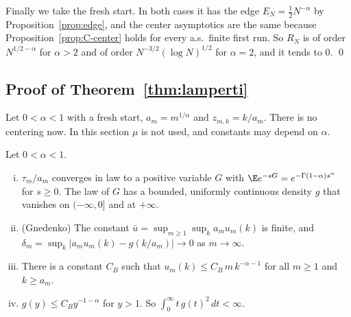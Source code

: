Finally we take the fresh start. In both cases it has the edge $E_N=\frac12N^{-\alpha}$
by Proposition~\ref{prop:edge}, and the center asymptotics are the same because
Proposition~\ref{prop:C-center} holds for every a.s.\ finite first run. So $R_N$ is of
order $N^{1/2-\alpha}$ for $\alpha>2$ and of order $N^{-3/2}(\log N)^{1/2}$ for
$\alpha=2$, and it tends to $0$.
\qed

\subsection{Proof of Theorem~\texorpdfstring{\ref{thm:lamperti}}{4.8}}\label{app:heavy-lamperti}

Let $0<\alpha<1$ with a fresh start, $a_m=m^{1/\alpha}$ and $z_{m,k}=k/a_m$. There is no
centering now. In this section $\mu$ is not used, and constants may depend on $\alpha$.

\begin{lemma}\label{lem:C-stable1}
Let $0<\alpha<1$.
\begin{enumerate}[(i)]
\item $\tau_m/a_m$ converges in law to a positive variable $G$ with
$\E e^{-sG}=e^{-\Gamma(1-\alpha)s^\alpha}$ for $s\ge0$. The law of $G$ has a bounded,
uniformly continuous density $g$ that vanishes on $(-\infty,0]$ and at $+\infty$.
\item (Gnedenko) The constant $\bar u=\sup_{m\ge1}\sup_ka_mu_m(k)$ is finite, and
$\delta_m=\sup_k\lvert a_mu_m(k)-g(k/a_m)\rvert\to0$ as $m\to\infty$.
\item There is a constant $C_B$ such that $u_m(k)\le C_B\,m\,k^{-\alpha-1}$ for all
$m\ge1$ and $k\ge a_m$.
\item $g(y)\le C_By^{-1-\alpha}$ for $y>1$. So $\int_0^\infty t\,g(t)^2\,dt<\infty$.
\end{enumerate}
\end{lemma}

